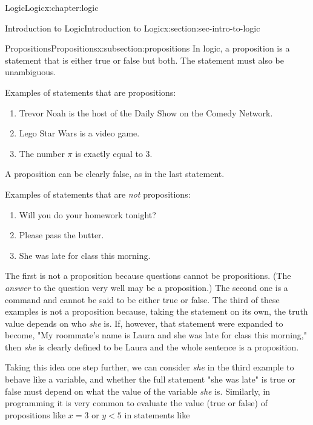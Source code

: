 \documentclass[twoside,10pt,]{book}
\numberwithin{equation}{section}
\newcommand{\lt}{<}
\begin{document}
\begin{chapterptx}{Logic}{}{Logic}{}{}{x:chapter:logic}
%
%
\typeout{************************************************}
\typeout{************************************************}
%
\begin{sectionptx}{Introduction to Logic}{}{Introduction to Logic}{}{}{x:section:sec-intro-to-logic}
%
%
\typeout{************************************************}
\typeout{************************************************}
%
\begin{subsectionptx}{Propositions}{}{Propositions}{}{}{x:subsection:propositions}
In logic, a proposition is a statement that is either true or false but both.  The statement must also be unambiguous.%
\par
Examples of statements that are propositions:%
\begin{enumerate}
\item{}Trevor Noah is the host of the Daily Show on the Comedy Network.%
\item{}Lego Star Wars is a video game.%
\item{}The number \(\pi\) is exactly equal to 3.%
\end{enumerate}
A proposition can be clearly false, as in the last statement.%
\par
Examples of statements that are \emph{not} propositions:%
\begin{enumerate}
\item{}Will you do your homework tonight?%
\item{}Please pass the butter.%
\item{}She was late for class this morning.%
\end{enumerate}
The first is not a  proposition because questions cannot be propositions. (The \emph{answer} to the question very well may be a proposition.)  The second one is a command and cannot be said to be either true or false.  The third of these examples is not a proposition because, taking the statement on its own, the truth value depends on who \emph{she} is.  If, however, that statement were expanded to become, "My roommate's name is Laura and she was late for class this morning," then \emph{she} is clearly defined to be Laura and the whole sentence is a proposition.%
\par
Taking this idea one step further, we can consider \emph{she} in the third example to behave like a variable, and whether the full statement "she was late" is true or false must depend on what the value of the variable \emph{she} is.  Similarly, in programming it is very common to evaluate the value (true or false) of propositions like \(x=3\) or \(y \lt 5\) in statements like%
\begin{codedisplay}


\end{codedisplay}
\end{subsectionptx}
\end{sectionptx}
\end{chapterptx}
\end{document}
